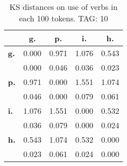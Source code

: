 \begin{table}[h!]
\begin{center}
\begin{tabular}{| l || c | c | c | c |}\hline
 & {\bf g.} & {\bf p.} & {\bf i.} & {\bf h.} \\\hline\hline
{\bf g.} & 0.000 & 0.971 & 1.076 & 0.543 \\
{\bf } & 0.000 & 0.046 & 0.036 & 0.023 \\\hline
{\bf p.} & 0.971 & 0.000 & 1.551 & 1.074 \\
{\bf } & 0.046 & 0.000 & 0.079 & 0.061 \\\hline
{\bf i.} & 1.076 & 1.551 & 0.000 & 0.532 \\
{\bf } & 0.036 & 0.079 & 0.000 & 0.024 \\\hline
{\bf h.} & 0.543 & 1.074 & 0.532 & 0.000 \\
{\bf } & 0.023 & 0.061 & 0.024 & 0.000 \\\hline
\end{tabular}
\caption{KS distances on use of verbs in each 100 tokens. TAG: 10}
\end{center}
\end{table}